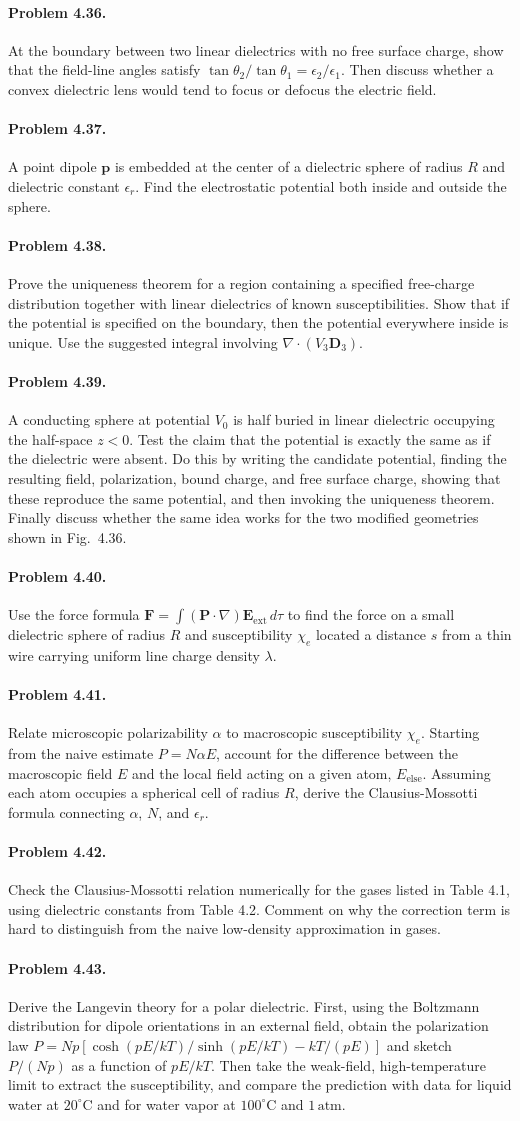 \documentclass{aa}
\newcommand{\problemstatement}[2]{%
\paragraph{Problem #1.}#2\par\medskip
}
\begin{document}
\problemstatement{4.36}{At the boundary between two linear dielectrics with no free surface charge, show that the field-line angles satisfy \(\tan\theta_2/\tan\theta_1=\epsilon_2/\epsilon_1\). Then discuss whether a convex dielectric lens would tend to focus or defocus the electric field.}
\problemstatement{4.37}{A point dipole \(\mathbf p\) is embedded at the center of a dielectric sphere of radius \(R\) and dielectric constant \(\epsilon_r\). Find the electrostatic potential both inside and outside the sphere.}
\problemstatement{4.38}{Prove the uniqueness theorem for a region containing a specified free-charge distribution together with linear dielectrics of known susceptibilities. Show that if the potential is specified on the boundary, then the potential everywhere inside is unique. Use the suggested integral involving \(\nabla\cdot(V_3\mathbf D_3)\).}
\problemstatement{4.39}{A conducting sphere at potential \(V_0\) is half buried in linear dielectric occupying the half-space \(z<0\). Test the claim that the potential is exactly the same as if the dielectric were absent. Do this by writing the candidate potential, finding the resulting field, polarization, bound charge, and free surface charge, showing that these reproduce the same potential, and then invoking the uniqueness theorem. Finally discuss whether the same idea works for the two modified geometries shown in Fig.~4.36.}
\problemstatement{4.40}{Use the force formula \(\mathbf F=\int(\mathbf P\cdot\nabla)\mathbf E_{\mathrm{ext}}\,d\tau\) to find the force on a small dielectric sphere of radius \(R\) and susceptibility \(\chi_e\) located a distance \(s\) from a thin wire carrying uniform line charge density \(\lambda\).}
\problemstatement{4.41}{Relate microscopic polarizability \(\alpha\) to macroscopic susceptibility \(\chi_e\). Starting from the naive estimate \(P=N\alpha E\), account for the difference between the macroscopic field \(E\) and the local field acting on a given atom, \(E_{\mathrm{else}}\). Assuming each atom occupies a spherical cell of radius \(R\), derive the Clausius-Mossotti formula connecting \(\alpha\), \(N\), and \(\epsilon_r\).}
\problemstatement{4.42}{Check the Clausius-Mossotti relation numerically for the gases listed in Table 4.1, using dielectric constants from Table 4.2. Comment on why the correction term is hard to distinguish from the naive low-density approximation in gases.}
\problemstatement{4.43}{Derive the Langevin theory for a polar dielectric. First, using the Boltzmann distribution for dipole orientations in an external field, obtain the polarization law \(P=Np[\cosh(pE/kT)/\sinh(pE/kT)-kT/(pE)]\) and sketch \(P/(Np)\) as a function of \(pE/kT\). Then take the weak-field, high-temperature limit to extract the susceptibility, and compare the prediction with data for liquid water at \(20^\circ\mathrm{C}\) and for water vapor at \(100^\circ\mathrm{C}\) and \(1\,\mathrm{atm}\).}
\end{document}

